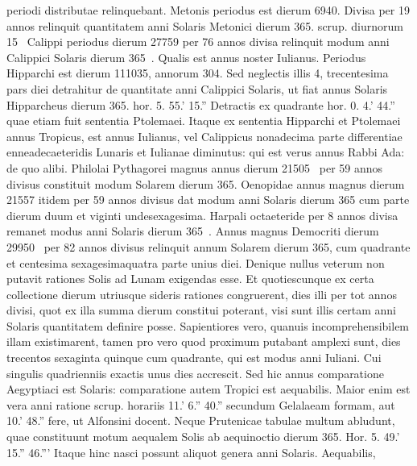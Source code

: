periodi distributae relinquebant.
Metonis periodus est dierum
6940.
Divisa per 19 annos relinquit quantitatem anni Solaris Metonici
dierum 365. scrup. diurnorum 15~ Calippi periodus dierum
27759 per 76 annos divisa relinquit modum anni Calippici Solaris
dierum 365~.
Qualis est annus noster Iulianus.
Periodus Hipparchi
est dierum 111035, annorum 304.
Sed neglectis illis 4,
trecentesima pars diei detrahitur de quantitate anni Calippici Solaris,
ut fiat annus Solaris Hipparcheus
 dierum 365. hor. 5. 55.' 15.'' 
Detractis ex quadrante hor. 0. 4.' 44.'' 
 quae etiam fuit sententia
Ptolemaei.
Itaque ex sententia Hipparchi et Ptolemaei annus
Tropicus, est annus Iulianus, vel Calippicus nonadecima parte
differentiae enneadecaeteridis Lunaris et Iulianae diminutus: qui
est verus annus Rabbi Ada: de quo alibi.
Philolai Pythagorei magnus
annus dierum 21505~ per 59 annos divisus constituit modum
Solarem dierum 365.
Oenopidae annus magnus dierum 21557
itidem per 59 annos divisus dat modum anni Solaris dierum 365 cum
parte dierum duum et viginti undesexagesima.
Harpali octaeteride per
8 annos divisa remanet modus anni Solaris dierum 365~.
Annus magnus
Democriti dierum 29950~ per 82 annos divisus relinquit annum
Solarem dierum 365, cum quadrante et centesima sexagesimaquatra
parte unius diei.
Denique nullus veterum non putavit rationes
Solis ad Lunam exigendas esse.
Et quotiescunque ex certa collectione
dierum utriusque sideris rationes congruerent, dies illi per tot
annos divisi, quot ex illa summa dierum constitui poterant, visi sunt
illis certam anni Solaris quantitatem definire posse.
Sapientiores vero,
quanuis incomprehensibilem illam existimarent, tamen pro vero quod
proximum putabant amplexi sunt, dies trecentos sexaginta quinque
cum quadrante, qui est modus anni Iuliani.
Cui singulis quadrienniis
exactis unus dies accrescit.
Sed hic annus comparatione Aegyptiaci
est Solaris: comparatione autem Tropici est aequabilis.
Maior
enim est vera anni ratione scrup. horariis 11.' 6.'' 40.'' secundum
Gelalaeam formam, aut 10.' 48.'' fere, ut Alfonsini docent.
Neque
Prutenicae tabulae multum abludunt, quae constituunt motum
aequalem Solis ab aequinoctio dierum 365. Hor. 5. 49.' 15.'' 46.'''
Itaque hinc nasci possunt aliquot genera anni Solaris.
Aequabilis,
